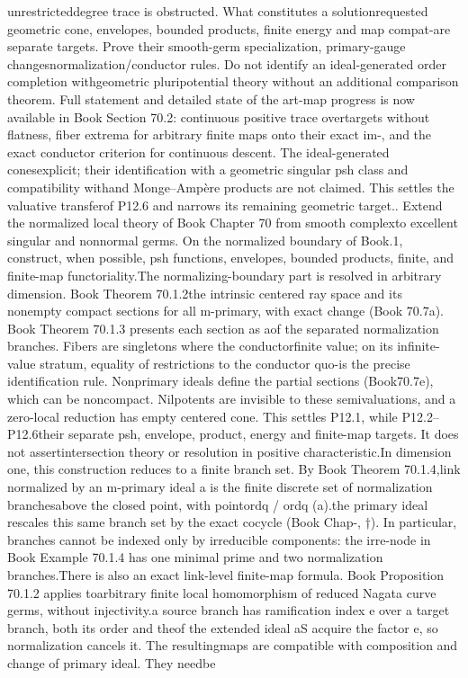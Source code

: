\documentclass[11pt]{article}
\begin{document}
\begin{GrantData}
{unrestricted\ncontinuous degree trace is obstructed.\n{}   What constitutes a solution\nThe requested geometric cone, envelopes, bounded products, ﬁnite energy and map compat-\nibility are separate targets. Prove their smooth-germ specialization, primary-gauge changes\nand normalization/conductor rules. Do not identify an ideal-generated order completion with\na geometric pluripotential theory without an additional comparison theorem.\n{}   Full statement and detailed state of the art\nFinite-map progress is now available in Book Section 70.2: continuous positive trace over\nnormal targets without ﬂatness, ﬁber extrema for arbitrary ﬁnite maps onto their exact im-\nages, and the exact conductor criterion for continuous descent. The ideal-generated cones\nare explicit; their identiﬁcation with a geometric singular psh class and compatibility with\nenvelopes and Monge–Ampère products are not claimed. This settles the valuative transfer\nlayer of P12.6 and narrows its remaining geometric target.\n{}\n{}. Extend the normalized local theory of Book Chapter 70 from smooth complex\ngerms to excellent singular and nonnormal germs. On the normalized boundary of Book.1, construct, when possible, psh functions, envelopes, bounded products, ﬁnite\nenergy, and ﬁnite-map functoriality.\n    The normalizing-boundary part is resolved in arbitrary dimension. Book Theorem 70.1.2\ngives the intrinsic centered ray space and its nonempty compact sections for all m-primary\nideals, with exact change (Book 70.7a). Book Theorem 70.1.3 presents each section as a\nquotient of the separated normalization branches. Fibers are singletons where the conductor\nhas ﬁnite value; on its inﬁnite-value stratum, equality of restrictions to the conductor quo-\ntient is the precise identiﬁcation rule. Nonprimary ideals deﬁne the partial sections (Book\n70.7e), which can be noncompact. Nilpotents are invisible to these semivaluations, and a zero-\ndimensional local reduction has empty centered cone. This settles P12.1, while P12.2–P12.6\nretain their separate psh, envelope, product, energy and ﬁnite-map targets. It does not assert\nan intersection theory or resolution in positive characteristic.\n    In dimension one, this construction reduces to a ﬁnite branch set. By Book Theorem 70.1.4,\nthe link normalized by an m-primary ideal a is the ﬁnite discrete set of normalization branches\nq above the closed point, with point\n\n                                         ordq / ordq (a).\n\nChanging the primary ideal rescales this same branch set by the exact cocycle (Book Chap-, †). In particular, branches cannot be indexed only by irreducible components: the irre-\nducible node in Book Example 70.1.4 has one minimal prime and two normalization branches.\n    There is also an exact link-level ﬁnite-map formula. Book Proposition 70.1.2 applies to\nan arbitrary ﬁnite local homomorphism of reduced Nagata curve germs, without injectivity.\nWhen a source branch has ramiﬁcation index e over a target branch, both its order and the\norder of the extended ideal aS acquire the factor e, so normalization cancels it. The resulting\nrestriction maps are compatible with composition and change of primary ideal. They need\nnot be }
\end{GrantData}
\end{document}
